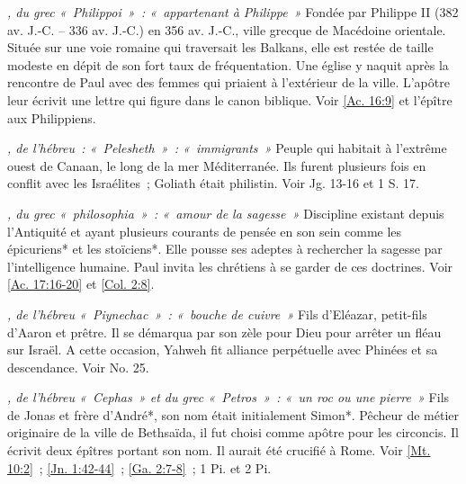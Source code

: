 \begin{multicols}{2}
\textit{, du grec «~Philippoi~»~: «~appartenant à Philippe~»}\newline
Fondée par Philippe II (382 av. J.-C. – 336 av. J.-C.) en 356 av. J.-C., ville grecque de Macédoine orientale. Située sur une voie romaine qui traversait les Balkans, elle est restée de taille modeste en dépit de son fort taux de fréquentation. Une église y naquit après la rencontre de Paul avec des femmes qui priaient à l'extérieur de la ville. L'apôtre leur écrivit une lettre qui figure dans le canon biblique.\newline
Voir \vref{Ac. 16:9} et l'épître aux Philippiens.

\textit{, de l'hébreu~: «~Pelesheth~»~: «~immigrants~»}\newline
Peuple qui habitait à l'extrême ouest de Canaan, le long de la mer Méditerranée. Ils furent plusieurs fois en conflit avec les Israélites~; Goliath était philistin.\newline
Voir Jg. 13-16 et 1 S. 17.

\textit{, du grec «~philosophia~»~: «~amour de la sagesse~»}\newline
Discipline existant depuis l'Antiquité et ayant plusieurs courants de pensée en son sein comme les épicuriens* et les stoïciens*. Elle pousse ses adeptes à rechercher la sagesse par l'intelligence humaine. Paul invita les chrétiens à se garder de ces doctrines.\newline
Voir \vref{Ac. 17:16-20} et \vref{Col. 2:8}.

\textit{, de l'hébreu «~Piynechac~»~: «~bouche de cuivre~»}\newline
Fils d'Eléazar, petit-fils d'Aaron et prêtre. Il se démarqua par son zèle pour Dieu pour arrêter un fléau sur Israël. A cette occasion, Yahweh fit alliance perpétuelle avec Phinées et sa descendance.\newline
Voir No. 25.

\textit{, de l'hébreu «~Cephas~» et du grec «~Petros~»~: «~un roc ou une pierre~»}\newline
Fils de Jonas et frère d'André*, son nom était initialement Simon*. Pêcheur de métier originaire de la ville de Bethsaïda, il fut choisi comme apôtre pour les circoncis. Il écrivit deux épîtres portant son nom. Il aurait été crucifié à Rome.\newline
Voir \vref{Mt. 10:2}~; \vref{Jn. 1:42-44}~; \vref{Ga. 2:7-8}~; 1 Pi. et 2 Pi.


\end{multicols}
